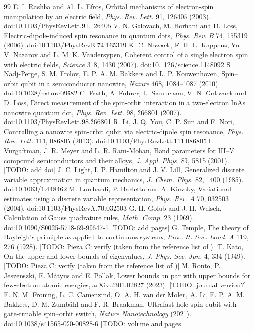 \documentclass[11pt]{article}
\theoremstyle{remark}
\newcommand{\todo}[1]{\textcolor{red!70!black}{[TODO: #1]}}
\begin{document}
\begin{thebibliography}{99}
 E. I. Rashba and Al. L. Efros, Orbital mechanisms of electron-spin manipulation by an electric field, \emph{Phys. Rev. Lett.} 91, 126405 (2003). doi:10.1103/PhysRevLett.91.126405
 V. N. Golovach, M. Borhani and D. Loss, Electric-dipole-induced spin resonance in quantum dots, \emph{Phys. Rev. B} 74, 165319 (2006). doi:10.1103/PhysRevB.74.165319
 K. C. Nowack, F. H. L. Koppens, Yu. V. Nazarov and L. M. K. Vandersypen, Coherent control of a single electron spin with electric fields, \emph{Science} 318, 1430 (2007). doi:10.1126/science.1148092
 S. Nadj-Perge, S. M. Frolov, E. P. A. M. Bakkers and L. P. Kouwenhoven, Spin--orbit qubit in a semiconductor nanowire, \emph{Nature} 468, 1084--1087 (2010). doi:10.1038/nature09682
 C. Fasth, A. Fuhrer, L. Samuelson, V. N. Golovach and D. Loss, Direct measurement of the spin-orbit interaction in a two-electron InAs nanowire quantum dot, \emph{Phys. Rev. Lett.} 98, 266801 (2007). doi:10.1103/PhysRevLett.98.266801
 R. Li, J. Q. You, C. P. Sun and F. Nori, Controlling a nanowire spin-orbit qubit via electric-dipole spin resonance, \emph{Phys. Rev. Lett.} 111, 086805 (2013). doi:10.1103/PhysRevLett.111.086805
 I. Vurgaftman, J. R. Meyer and L. R. Ram-Mohan, Band parameters for III--V compound semiconductors and their alloys, \emph{J. Appl. Phys.} 89, 5815 (2001). \todo{add doi}
 J. C. Light, I. P. Hamilton and J. V. Lill, Generalized discrete variable approximation in quantum mechanics, \emph{J. Chem. Phys.} 82, 1400 (1985). doi:10.1063/1.448462
 M. Lombardi, P. Barletta and A. Kievsky, Variational estimates using a discrete variable representation, \emph{Phys. Rev. A} 70, 032503 (2004). doi:10.1103/PhysRevA.70.032503
 G. H. Golub and J. H. Welsch, Calculation of Gauss quadrature rules, \emph{Math. Comp.} 23 (1969). doi:10.1090/S0025-5718-69-99647-1 \todo{add pages}
 G. Temple, The theory of Rayleigh's principle as applied to continuous systems, \emph{Proc. R. Soc. Lond. A} 119, 276 (1928). \todo{Pieza C: verify (taken from the reference list of \cite{ronto2023})}
 T. Kato, On the upper and lower bounds of eigenvalues, \emph{J. Phys. Soc. Jpn.} 4, 334 (1949). \todo{Pieza C: verify (taken from the reference list of \cite{ronto2023})}
 M. Ronto, P. Jeszenszki, E. M\'atyus and E. Pollak, Lower bounds on par with upper bounds for few-electron atomic energies, arXiv:2301.02827 (2023). \todo{journal version?}
 F. N. M. Froning, L. C. Camenzind, O. A. H. van der Molen, A. Li, E. P. A. M. Bakkers, D. M. Zumb\"uhl and F. R. Braakman, Ultrafast hole spin qubit with gate-tunable spin--orbit switch, \emph{Nature Nanotechnology} (2021). doi:10.1038/s41565-020-00828-6 \todo{volume and pages}
\end{thebibliography}
\end{document}
